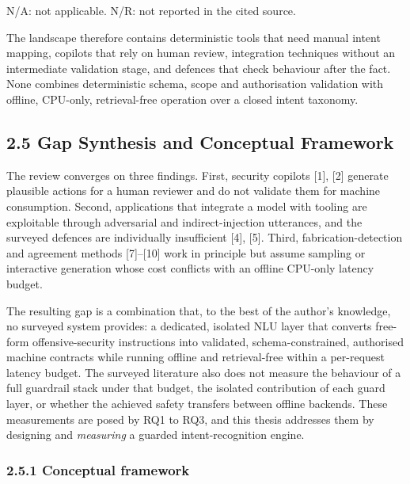 \documentclass[
]{article}
\begin{document}
N/A: not applicable. N/R: not reported in the cited source.

The landscape therefore contains deterministic tools that need manual
intent mapping, copilots that rely on human review, integration
techniques without an intermediate validation stage, and defences that
check behaviour after the fact. None combines deterministic schema,
scope and authorisation validation with offline, CPU-only,
retrieval-free operation over a closed intent taxonomy.

\hypertarget{gap-synthesis-and-conceptual-framework}{%
\subsection{2.5 Gap Synthesis and Conceptual
Framework}\label{gap-synthesis-and-conceptual-framework}}

The review converges on three findings. First, security copilots
{[}1{]}, {[}2{]} generate plausible actions for a human reviewer and do
not validate them for machine consumption. Second, applications that
integrate a model with tooling are exploitable through adversarial and
indirect-injection utterances, and the surveyed defences are
individually insufficient {[}4{]}, {[}5{]}. Third, fabrication-detection
and agreement methods {[}7{]}--{[}10{]} work in principle but assume
sampling or interactive generation whose cost conflicts with an offline
CPU-only latency budget.

The resulting gap is a combination that, to the best of the author's
knowledge, no surveyed system provides: a dedicated, isolated NLU layer
that converts free-form offensive-security instructions into validated,
schema-constrained, authorised machine contracts while running offline
and retrieval-free within a per-request latency budget. The surveyed
literature also does not measure the behaviour of a full guardrail stack
under that budget, the isolated contribution of each guard layer, or
whether the achieved safety transfers between offline backends. These
measurements are posed by RQ1 to RQ3, and this thesis addresses them by
designing and \emph{measuring} a guarded intent-recognition engine.

\hypertarget{conceptual-framework}{%
\subsubsection{2.5.1 Conceptual framework}\label{conceptual-framework}}
\end{document}
